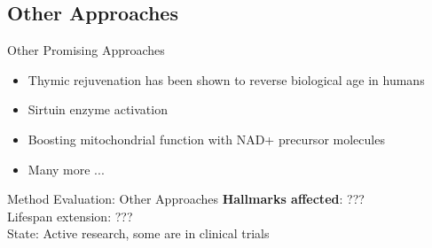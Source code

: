 \subsection{Other Approaches}

\begin{frame}[c]{Other Promising Approaches}
    \large
    \begin{itemize}[<+(1)->]
        \item Thymic rejuvenation has been shown to reverse biological age in humans \cite{fahy2019reversal}
        \item Sirtuin enzyme activation \cite{mohar2012sirtuin}
        \item Boosting mitochondrial function with NAD+ precursor molecules \cite{aman2018therapeutic}
        \item Many more ...
    \end{itemize}
\end{frame}


\begin{frame}[c]{Method Evaluation: Other Approaches}
    \large
    \textbf{Hallmarks affected}: ??? \\
    \pause
    Lifespan extension: ??? \\
    \pause
    State: Active research, some are in clinical trials
\end{frame}
